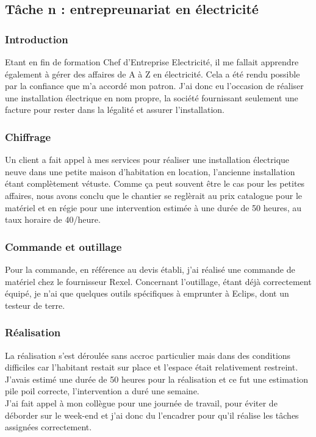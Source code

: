 \documentclass[a4paper, 12pt]{article}
\begin{document}
\subsection{Tâche n : entrepreunariat en électricité}

\subsubsection{Introduction}

Etant en fin de formation Chef d'Entreprise Electricité, il me fallait apprendre également à gérer des affaires de A à Z en électricité. Cela a été rendu possible par la confiance que m'a accordé mon patron. J'ai donc eu l'occasion de réaliser une installation électrique en nom propre, la société fournissant seulement une facture pour rester dans la légalité et assurer l'installation.

\subsubsection{Chiffrage}

Un client a fait appel à mes services pour réaliser une installation électrique neuve dans une petite maison d'habitation en location, l'ancienne installation étant complètement vétuste. Comme ça peut souvent être le cas pour les petites affaires, nous avons conclu que le chantier se reglèrait au prix catalogue pour le matériel et en régie pour une intervention estimée à une durée de 50 heures, au taux horaire de 40\EUR/heure.

\subsubsection{Commande et outillage}

Pour la commande, en référence au devis établi, j'ai réalisé une commande de matériel chez le fournisseur Rexel. Concernant l'outillage, étant déjà correctement équipé, je n'ai que quelques outils spécifiques à emprunter à Eclips, dont un testeur de terre.

\subsubsection{Réalisation}

La réalisation s'est déroulée sans accroc particulier mais dans des conditions difficiles car l'habitant restait sur place et l'espace était relativement restreint. J'avais estimé une durée de 50 heures pour la réalisation et ce fut une estimation pile poil correcte, l'intervention a duré une semaine.\\
J'ai fait appel à mon collègue pour une journée de travail, pour éviter de déborder sur le week-end et j'ai donc du l'encadrer pour qu'il réalise les tâches assignées correctement.\\
\end{document}
